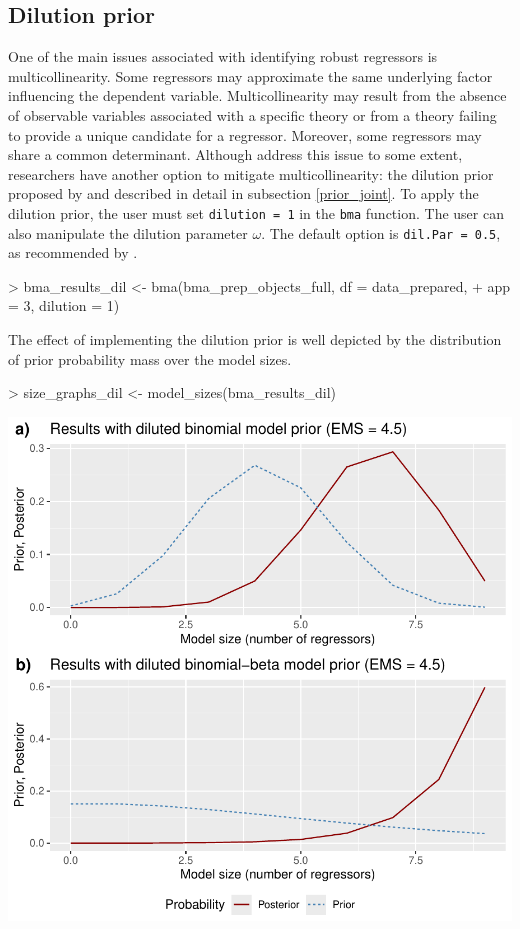 \documentclass[a4paper]{article}
\begin{document}
\subsection{Dilution prior}\label{dil}
One of the main issues associated with identifying robust regressors is multicollinearity. Some regressors may approximate the same underlying factor influencing the dependent variable. Multicollinearity may result from the absence of observable variables associated with a specific theory or from a theory failing to provide a unique candidate for a regressor. Moreover, some regressors may share a common determinant. Although \citet{Moral+2013, Moral+2016} address this issue to some extent, researchers have another option to mitigate multicollinearity: the dilution prior proposed by \citet{George+2010} and described in detail in subsection \ref{prior_joint}. To apply the dilution prior, the user must set \verb+dilution = 1+ in the \verb+bma+ function. The user can also manipulate the dilution parameter $\omega$. The default option is \verb+dil.Par = 0.5+, as recommended by \citet{George+2010}.
\begin{Schunk}
\begin{Sinput}
> bma_results_dil <- bma(bma_prep_objects_full, df = data_prepared,
+                        app = 3, dilution = 1)
\end{Sinput}
\end{Schunk}
The effect of implementing the dilution prior is well depicted by the distribution of prior probability mass over the model sizes.
\begin{Schunk}
\begin{Sinput}
> size_graphs_dil <- model_sizes(bma_results_dil)
\end{Sinput}
\end{Schunk}
\includegraphics{bdsm_vignette-040}
\end{document}
